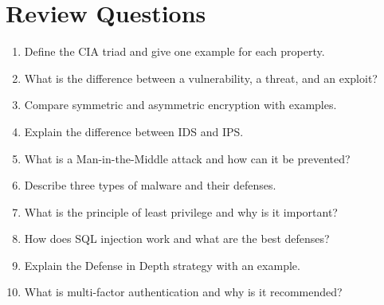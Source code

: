 \documentclass[11pt,a4paper]{article}
\begin{document}
\section{Review Questions}

\begin{enumerate}[leftmargin=*]
  \item Define the CIA triad and give one example for each property.
  \item What is the difference between a vulnerability, a threat, and an exploit?
  \item Compare symmetric and asymmetric encryption with examples.
  \item Explain the difference between IDS and IPS.
  \item What is a Man-in-the-Middle attack and how can it be prevented?
  \item Describe three types of malware and their defenses.
  \item What is the principle of least privilege and why is it important?
  \item How does SQL injection work and what are the best defenses?
  \item Explain the Defense in Depth strategy with an example.
  \item What is multi-factor authentication and why is it recommended?
\end{enumerate}
\end{document}
